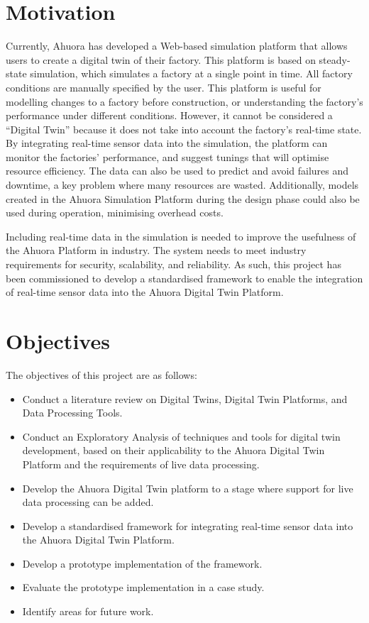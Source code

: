 \documentclass[12pt]{book}
\begin{document}
\section{Motivation}

Currently, Ahuora has developed a Web-based simulation platform that allows users to create a digital twin of their factory. 
This platform is based on steady-state simulation, which simulates a factory at a single point in time. All factory conditions are manually specified by the user.
This platform is useful for modelling changes to a factory before construction, or understanding the factory's performance under different conditions.
However, it cannot be considered a ``Digital Twin'' because it does not take into account the factory's real-time state.
By integrating real-time sensor data into the simulation, the platform can monitor the factories' performance, and suggest tunings that will optimise resource efficiency.
The data can also be used to predict and avoid failures and downtime, a key problem where many resources are wasted.
Additionally, models created in the Ahuora Simulation Platform during the design phase could also be used during operation, minimising overhead costs.

Including real-time data in the simulation is needed to improve the usefulness of the Ahuora Platform in industry. 
The system needs to meet industry requirements for security, scalability, and reliability. As such, this project 
has been commissioned to develop a standardised framework to enable the integration of real-time sensor data into the Ahuora Digital Twin Platform.


\section{Objectives}

The objectives of this project are as follows:
\begin{itemize}
    \item Conduct a literature review on Digital Twins, Digital Twin Platforms, and Data Processing Tools.
    \item Conduct an Exploratory Analysis of techniques and tools for digital twin development, based on their applicability to the Ahuora Digital Twin Platform and the requirements of live data processing.
    \item Develop the Ahuora Digital Twin platform to a stage where support for live data processing can be added.
    \item Develop a standardised framework for integrating real-time sensor data into the Ahuora Digital Twin Platform.
    \item Develop a prototype implementation of the framework.
    \item Evaluate the prototype implementation in a case study.
    \item Identify areas for future work.
\end{itemize}
\end{document}
